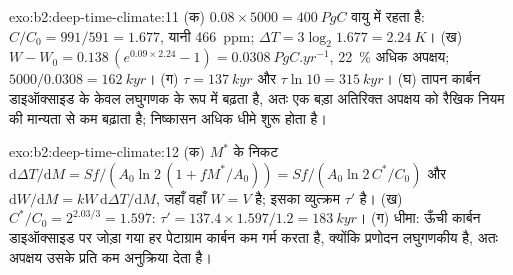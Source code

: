 \begin{solution}{exo:b2:deep-time-climate:11}
(क) $0.08\times5000 = \qty{400}{PgC}$ वायु में रहता है: $C/C_0 = 991/591 = 1.677$, यानी
\qty{466}{ppm}; $\Delta T = 3\log_2 1.677 = \qty{2.24}{K}$। (ख) $W - W_0 = 0.138\,(e^{0.09\times2.24}
- 1) = \qty{0.0308}{PgC.yr^{-1}}$, \qty{22}{\percent} अधिक अपक्षय; $5000/0.0308 =
\qty{162}{kyr}$। (ग) $\tau = \qty{137}{kyr}$ और $\tau\ln10 = \qty{315}{kyr}$। (घ) तापन कार्बन
डाइऑक्साइड के केवल लघुगणक के रूप में बढ़ता है, अतः एक बड़ा अतिरिक्त अपक्षय को रैखिक नियम की
मान्यता से कम बढ़ाता है; निष्कासन अधिक धीमे शुरू होता है।
\end{solution}

\begin{solution}{exo:b2:deep-time-climate:12}
(क) $M^*$ के निकट $\mathrm d\Delta T/\mathrm dM = Sf/(A_0\ln 2\,(1 + fM^*/A_0)) = Sf/(A_0\ln 2\,
C^*/C_0)$ और $\mathrm dW/\mathrm dM = kW\,\mathrm d\Delta T/\mathrm dM$, जहाँ वहाँ $W = V$ है;
इसका व्युत्क्रम $\tau'$ है। (ख) $C^*/C_0 = 2^{2.03/3} = 1.597$: $\tau' = 137.4\times1.597/1.2 =
\qty{183}{kyr}$। (ग) धीमा: ऊँची कार्बन डाइऑक्साइड पर जोड़ा गया हर पेटाग्राम कार्बन कम गर्म करता है,
क्योंकि प्रणोदन लघुगणकीय है, अतः अपक्षय उसके प्रति कम अनुक्रिया देता है।
\end{solution}

